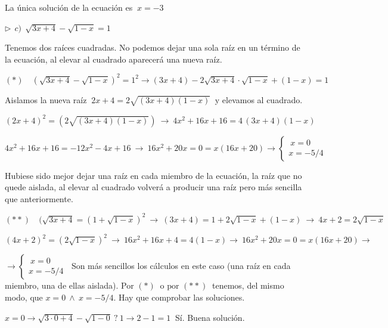 \begin{miejercicio}
\vspace{2mm} La única solución de la ecuación es $\ x=-3$


\vspace{5mm} $\triangleright \ \ c)\ \ \sqrt{3x+4}-\sqrt{1-x}=1$

\vspace{2mm} Tenemos dos raíces cuadradas. No podemos dejar una sola raíz en un término de la ecuación, al elevar al cuadrado aparecerá una nueva raíz.

\vspace{2mm} $(*) \quad (\sqrt{3x+4}-\sqrt{1-x})^2=1^2 \to (3x+4) -2 \sqrt{3x+4}\cdot \sqrt{1-x} + (1-x)=1$ 

\vspace{2mm} Aislamos la nueva raíz $\ 2x+4=2\sqrt{(3x+4)(1-x)}\ $ y elevamos al cuadrado.

\vspace{2mm} $ (2x+4)^2=(2\sqrt{(3x+4)(1-x)})\  \to  \ 4x^2+16x+16=4\,(3x+4)(1-x)$

\vspace{2mm} $4x^2+16x+16=-12x^2-4x+16 \ \to \ 16x^2+20x=0=x(16x+20) \to  \begin{cases} \ x=0 \\ x=-5/4 \end{cases}$

\vspace{2mm} Hubiese sido mejor dejar una raíz en cada miembro de la ecuación, la raíz que no quede aislada, al elevar al cuadrado volverá a producir una raíz pero más sencilla que anteriormente.

\vspace{2mm} $(**) \quad (\sqrt{3x+4}=(1+\sqrt{1-x})^2\ \to \ (3x+4)=1+2\sqrt{1-x}+(1-x) \ \to \ 4x+2=2\sqrt{1-x}$

\vspace{2mm} $(4x+2)^2=(2\sqrt{1-x})^2 \ \to \ 16x^2+16x+4=4(1-x)  \to \ 16x^2+20x=0=x(16x+20) \to  $

\vspace{2mm} $\to \begin{cases} \ x=0 \\ x=-5/4 \end{cases}\ $ Son más sencillos los cálculos en este caso (una raíz en cada miembro, una de ellas aislada). Por $(*) \  \text{ o por } (**) \ $ tenemos, del mismo modo, que  $x=0\ \wedge \ x=-5/4$. Hay que comprobar las soluciones.

\vspace{2mm} $x=0 \to \sqrt{3\cdot 0+4}-\sqrt{1-0}\ ? \ 1 \to 2-1=1\ $ Sí. Buena solución.


\end{miejercicio}
